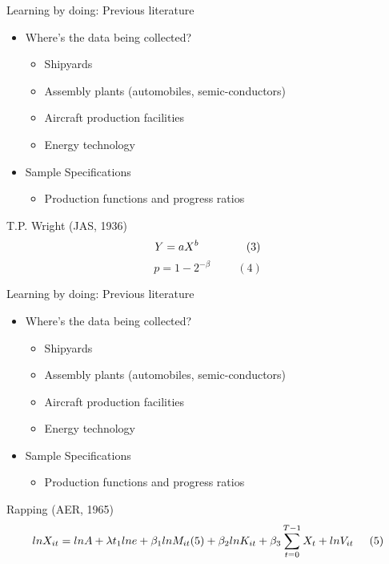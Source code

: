 \documentclass{beamer}
\begin{document}
\begin{frame}{Learning by doing: Previous literature}
    \begin{itemize}
        \item Where's the data being collected?
        \begin{itemize}
            \item Shipyards
            \item Assembly plants (automobiles, semic-conductors)
            \item Aircraft production facilities
            \item Energy technology
        \end{itemize}
        \item Sample Specifications
        \begin{itemize}
            \item Production functions and progress ratios
        \end{itemize}
    \end{itemize}
    \vspace{0.5cm}
    T.P. Wright (JAS, 1936)
    \[ Y = aX^b \hspace{1.5cm} (3) \]
    \[ p = 1 - 2^{-\beta} \hspace{1cm} (4) \]
\end{frame}


\begin{frame}{Learning by doing: Previous literature}
    \begin{itemize}
        \item Where's the data being collected?
        \begin{itemize}
            \item Shipyards
            \item Assembly plants (automobiles, semic-conductors)
            \item Aircraft production facilities
            \item Energy technology
        \end{itemize}
        \item Sample Specifications
        \begin{itemize}
            \item Production functions and progress ratios
        \end{itemize}
    \end{itemize}
    \vspace{0.5cm}
    Rapping (AER, 1965)
    \[ ln{X_{it}} = ln{A} + \lambda t_1 ln{e} + \beta_1 ln{M_{it}} (5) + \beta_2 ln{K_{it}} + \beta_3 \sum_{t=0}^{T-1} X_t + ln{V_{it}} \hspace{0.5cm} (5)\]
\end{frame}
\end{document}
